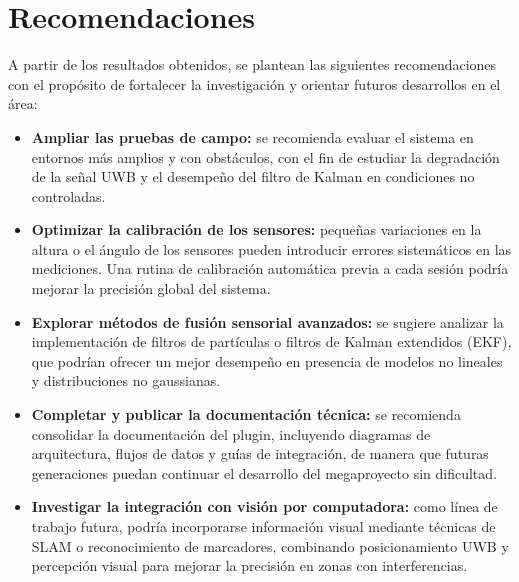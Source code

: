\section{Recomendaciones}

A partir de los resultados obtenidos, se plantean las siguientes recomendaciones con el propósito de fortalecer la investigación y orientar futuros desarrollos en el área:

\begin{itemize}
    \item \textbf{Ampliar las pruebas de campo:} se recomienda evaluar el sistema en entornos más amplios y con obstáculos, con el fin de estudiar la degradación de la señal UWB y el desempeño del filtro de Kalman en condiciones no controladas.
    
    \item \textbf{Optimizar la calibración de los sensores:} pequeñas variaciones en la altura o el ángulo de los sensores pueden introducir errores sistemáticos en las mediciones. Una rutina de calibración automática previa a cada sesión podría mejorar la precisión global del sistema.
    
    \item \textbf{Explorar métodos de fusión sensorial avanzados:} se sugiere analizar la implementación de filtros de partículas o filtros de Kalman extendidos (EKF), que podrían ofrecer un mejor desempeño en presencia de modelos no lineales y distribuciones no gaussianas.
    
    \item \textbf{Completar y publicar la documentación técnica:} se recomienda consolidar la documentación del plugin, incluyendo diagramas de arquitectura, flujos de datos y guías de integración, de manera que futuras generaciones puedan continuar el desarrollo del megaproyecto sin dificultad.
    
    \item \textbf{Investigar la integración con visión por computadora:} como línea de trabajo futura, podría incorporarse información visual mediante técnicas de SLAM o reconocimiento de marcadores, combinando posicionamiento UWB y percepción visual para mejorar la precisión en zonas con interferencias.
\end{itemize}